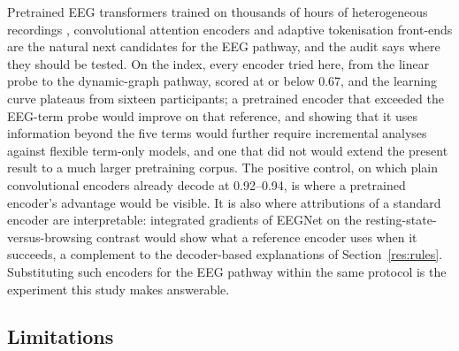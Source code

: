 Pretrained EEG transformers trained on thousands of hours of heterogeneous recordings \cite{ref55,ref56}, convolutional attention encoders \cite{ref57} and adaptive tokenisation front-ends \cite{ref58} are the natural next candidates for the EEG pathway, and the audit says where they should be tested. On the index, every encoder tried here, from the linear probe to the dynamic-graph pathway, scored at or below 0.67, and the learning curve plateaus from sixteen participants; a pretrained encoder that exceeded the EEG-term probe would improve on that reference, and showing that it uses information beyond the five terms would further require incremental analyses against flexible term-only models, and one that did not would extend the present result to a much larger pretraining corpus. The positive control, on which plain convolutional encoders already decode at 0.92--0.94, is where a pretrained encoder's advantage would be visible. It is also where attributions of a standard encoder are interpretable: integrated gradients of EEGNet on the resting-state-versus-browsing contrast would show what a reference encoder uses when it succeeds, a complement to the decoder-based explanations of Section~\ref{res:rules}. Substituting such encoders for the EEG pathway within the same protocol is the experiment this study makes answerable.

\subsection{Limitations}\label{disc:limits}

